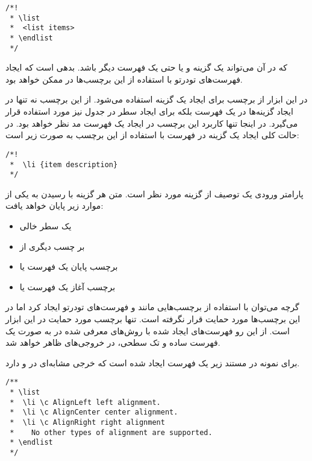 \begin{latin}
\lstset{language=C++}  
\begin{lstlisting}[frame=single] 
/*! 
 * \list
 *	<list items>
 * \endlist
 */
\end{lstlisting}
\end{latin}

که در آن  می‌تواند یک گزینه و یا حتی یک فهرست دیگر باشد. بدهی
است که ایجاد فهرست‌های تودرتو با استفاده از این برچسب‌ها در  ممکن
خواهد بود.

در این ابزار از برچسب  برای ایجاد یک گزینه استفاده می‌شود. از این برچسب
نه تنها در ایجاد گزینه‌ها در یک فهرست بلکه برای ایجاد سطر در جدول نیز مورد
استفاده قرار می‌گیرد. در اینجا تنها کاربرد این برچسب در ایجاد یک فهرست مد نظر
خواهد بود.
در حالت کلی ایجاد یک گزینه در فهرست با استفاده از این برچسب به صورت زیر است:

\begin{latin}
 \lstset{language=C++}  
\begin{lstlisting}[frame=single] 
/*! 
 *  \li {item description}
 */
\end{lstlisting}
\end{latin}

پارامتر ورودی یک توصیف از گزینه مورد نظر است. متن هر گزینه با رسیدن به یکی از
موارد زیر پایان خواهد یافت:
\begin{itemize}
  \item یک سطر خالی
  \item بر چسب دیگری از 
  \item برچسب پایان یک فهرست یا 
  \item برچسب آغاز یک فهرست یا 
\end{itemize}

\begin{warning}
گرچه می‌توان با استفاده از برچسب‌هایی مانند  و  فهرست‌های
تودرتو ایجاد کرد اما در  این برچسب‌ها مورد حمایت قرار نگرفته است.
تنها برچسب مورد حمایت در این ابزار  است. از این رو فهرست‌های ایجاد شده با
روش‌های معرفی شده در  به صورت یک فهرست ساده و تک سطحی، در خروجی‌های
 ظاهر خواهد شد.
\end{warning}

برای نمونه در مستند زیر یک فهرست ایجاد شده است که خرجی مشابه‌ای در 
و  دارد.

\begin{latin}
 \lstset{language=C++}  
\begin{lstlisting}[frame=single] 
/**
 * \list
 *  \li \c AlignLeft left alignment.
 *  \li \c AlignCenter center alignment.
 *  \li \c AlignRight right alignment
 *	  No other types of alignment are supported.
 * \endlist
 */
\end{lstlisting}
\end{latin}

